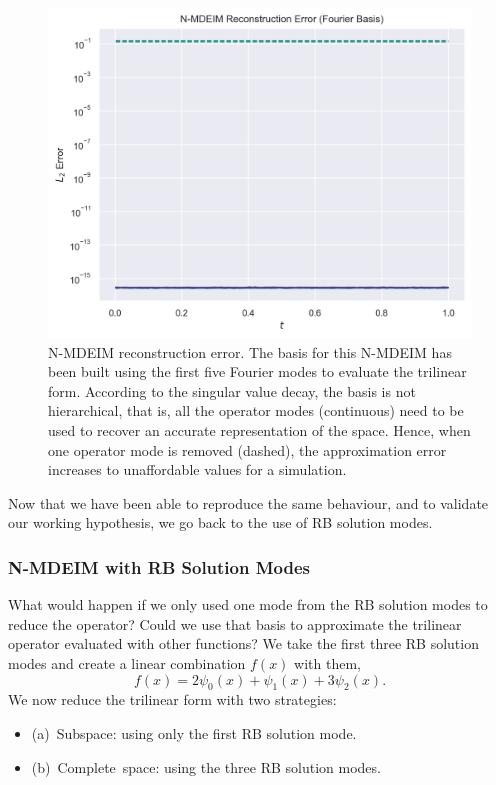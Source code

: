\documentclass[../../thesis.tex]{subfiles}
\begin{document}
\begin{figure}[h]
    \includegraphics[width=\columnwidth]{research_project/piston/figures/svd_fourier/fourier_basis_mdeim_truncation_errors_comparison.png}
    \caption{N-MDEIM reconstruction error.
    The basis for this N-MDEIM has been built using 
    the first five Fourier modes to evaluate the trilinear form.
    According to the singular value decay, the basis is not hierarchical, 
    that is, all the operator modes (continuous) need to be used to 
    recover an accurate representation of the space.
    Hence, when one operator mode is removed (dashed), 
    the approximation error increases to unaffordable values for a simulation.}
    \label{fig:appendix_fourier_nmdeim_reconstruction_error}
\end{figure}
Now that we have been able to reproduce the same behaviour, 
and to validate our working hypothesis,
we go back to the use of RB solution modes.

\subsubsection{N-MDEIM with RB Solution Modes}
\label{sec:nmdeim_one_mode}
What would happen if we only used one mode from the RB solution modes to reduce the operator?
Could we use that basis to approximate the trilinear operator evaluated with other functions?
We take the first three RB solution modes 
and create a linear combination $f(x)$ with them,
\begin{equation}
    f(x) = 2 \psi_0(x) + \psi_1(x) + 3 \psi_2(x).
\end{equation} 
We now reduce the trilinear form with two strategies:
\begin{itemize}
    \item \mbox{(a) Subspace}: using only the first RB solution mode.
    \item \mbox{(b) Complete space}: using the three RB solution modes.
\end{itemize}
\end{document}
